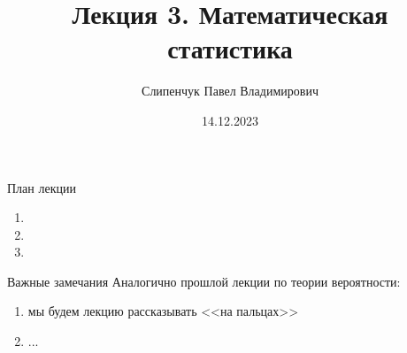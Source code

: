 
  

\title{Лекция 3. Математическая статистика}
\date{14.12.2023}
\author{Слипенчук Павел Владимирович}



  \maketitle
    
\begin{frame}{План лекции}\label{frame:plan}
    \begin{enumerate}
    
    
    \item {}
    \item {}
    \item {}
	


	\end{enumerate}
 \end{frame}

\begin{frame}{Важные замечания}
Аналогично прошлой лекции по теории вероятности:
\begin{enumerate}
	\item мы будем лекцию рассказывать <<на пальцах>>
	\item ...
\end{enumerate}
\end{frame}


